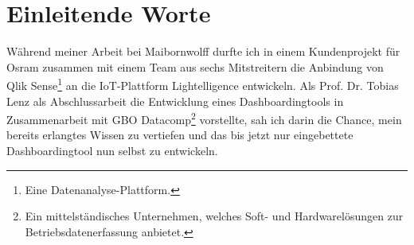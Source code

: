 \chapter*{Einleitende Worte}
\label{chap:einleitende-worte}
Während meiner Arbeit bei Maibornwolff durfte ich in einem
Kundenprojekt für Osram zusammen mit einem Team aus sechs Mitstreitern die
Anbindung von Qlik Sense\footnote{Eine Datenanalyse-Plattform.}
an die IoT-Plattform Lightelligence entwickeln. Als Prof. Dr.
Tobias Lenz als Abschlussarbeit die Entwicklung eines Dashboardingtools
in Zusammenarbeit mit GBO Datacomp\footnote{Ein mittelständisches Unternehmen, welches Soft- und Hardwarelösungen zur Betriebsdatenerfassung
anbietet.} vorstellte, sah ich darin die
Chance, mein bereits erlangtes Wissen zu vertiefen und das bis jetzt
nur eingebettete Dashboardingtool nun selbst zu entwickeln.

